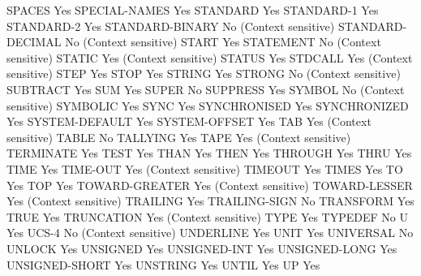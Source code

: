 SPACES                          Yes
SPECIAL-NAMES                   Yes
STANDARD                        Yes
STANDARD-1                      Yes
STANDARD-2                      Yes
STANDARD-BINARY                 No (Context sensitive)
STANDARD-DECIMAL                No (Context sensitive)
START                           Yes
STATEMENT                       No (Context sensitive)
STATIC                          Yes (Context sensitive)
STATUS                          Yes
STDCALL                         Yes (Context sensitive)
STEP                            Yes
STOP                            Yes
STRING                          Yes
STRONG                          No (Context sensitive)
SUBTRACT                        Yes
SUM                             Yes
SUPER                           No
SUPPRESS                        Yes
SYMBOL                          No (Context sensitive)
SYMBOLIC                        Yes
SYNC                            Yes
SYNCHRONISED                    Yes
SYNCHRONIZED                    Yes
SYSTEM-DEFAULT                  Yes
SYSTEM-OFFSET                   Yes
TAB                             Yes (Context sensitive)
TABLE                           No
TALLYING                        Yes
TAPE                            Yes (Context sensitive)
TERMINATE                       Yes
TEST                            Yes
THAN                            Yes
THEN                            Yes
THROUGH                         Yes
THRU                            Yes
TIME                            Yes
TIME-OUT                        Yes (Context sensitive)
TIMEOUT                         Yes
TIMES                           Yes
TO                              Yes
TOP                             Yes
TOWARD-GREATER                  Yes (Context sensitive)
TOWARD-LESSER                   Yes (Context sensitive)
TRAILING                        Yes
TRAILING-SIGN                   No
TRANSFORM                       Yes
TRUE                            Yes
TRUNCATION                      Yes (Context sensitive)
TYPE                            Yes
TYPEDEF                         No
U                               Yes
UCS-4                           No (Context sensitive)
UNDERLINE                       Yes
UNIT                            Yes
UNIVERSAL                       No
UNLOCK                          Yes
UNSIGNED                        Yes
UNSIGNED-INT                    Yes
UNSIGNED-LONG                   Yes
UNSIGNED-SHORT                  Yes
UNSTRING                        Yes
UNTIL                           Yes
UP                              Yes
